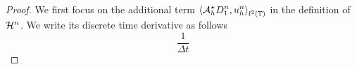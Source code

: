 \documentclass[11pt]{amsart}
\numberwithin{equation}{section}
\numberwithin{figure}{section}
\begin{document}
\begin{proof}
We first focus on the additional term $\displaystyle \left\langle
{\mathcal A}_h^\star D_1^n, u_h^n\right\rangle_{l^2\left({\mathbb T}\right)}$ in the definition of ${\mathcal H}^n$.
We write its discrete time derivative as follows
\[
\frac{1}{\Delta t}
\]
\end{proof}
\end{document}
